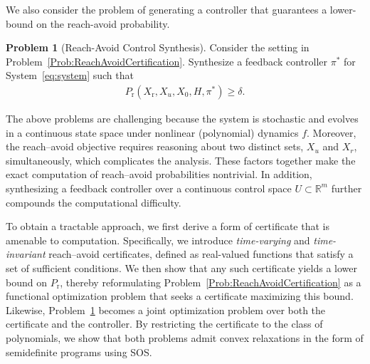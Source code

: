 \documentclass[journal,twoside,web]{ieeecolor}
\newcommand{\safe}{\mathrm{s}}
\newcommand{\reach}{\mathrm{r}}
\newcommand{\reals}{\mathbb{R}}
\newcommand{\hor}{H}
\newcommand{\Pfinopt}{P_{\reach}(X_{\reach}, X_u, X_0, \hor, \pi^{\ast})}
\theoremstyle{definition}
\newtheorem{problem}{Problem}
\theoremstyle{plain}
\theoremstyle{plain}
\begin{document}

We also consider the problem of generating a controller that guarantees a lower-bound on the reach-avoid probability.

\begin{problem}[Reach-Avoid Control Synthesis]
\label{Prob:ReachAvoidSynthesis}
Consider the setting in Problem~\ref{Prob:ReachAvoidCertification}.  Synthesize a feedback controller $\pi^*$ for System~\eqref{eq:system} such that
    \begin{align*}
    \Pfinopt \geq \delta.
    \end{align*}
\end{problem}


The above problems are challenging because the system is stochastic and evolves in a continuous state space under nonlinear (polynomial) dynamics $f$. Moreover, the reach–avoid objective requires reasoning about two distinct sets, $X_u$ and $X_r$, simultaneously, which complicates the analysis. These factors together make the exact computation of reach–avoid probabilities nontrivial. In addition, synthesizing a feedback controller over a continuous control space $U \subset \reals^m$ further compounds the computational difficulty.

To obtain a tractable approach, we first derive a form of certificate that is amenable to computation. Specifically, we introduce \emph{time-varying} and \emph{time-invariant} reach–avoid certificates, defined as real-valued functions that satisfy a set of sufficient conditions. We then show that any such certificate yields a lower bound on $P_\reach$, thereby reformulating Problem~\ref{Prob:ReachAvoidCertification} as a functional optimization problem that seeks a certificate maximizing this bound. Likewise, Problem~\ref{Prob:ReachAvoidSynthesis} becomes a joint optimization problem over both the certificate and the controller. By restricting the certificate to the class of polynomials, we show that both problems admit convex relaxations in the form of semidefinite programs using SOS.
\end{document}
